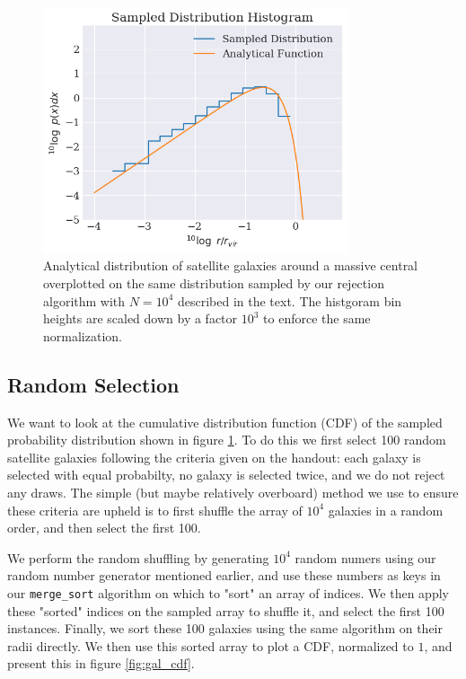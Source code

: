 \begin{figure}
    \centering
    \includegraphics[width=0.8\textwidth]{results/satellite_galaxies_pdf.png}
    \caption{Analytical distribution of satellite galaxies around a massive central overplotted on the same distribution sampled by our rejection algorithm with $N=10^4$ described in the text. The histgoram bin heights are scaled down by a factor $10^3$ to enforce the same normalization.}
    \label{fig:gal_pdf}
\end{figure}


\subsection{Random Selection}

We want to look at the cumulative distribution function (CDF) of the sampled probability distribution shown in figure \ref{fig:gal_pdf}. To do this we first select 100 random satellite galaxies following the criteria given on the handout: each galaxy is selected with equal probabilty, no galaxy is selected twice, and we do not reject any draws. The simple (but maybe relatively overboard) method we use to ensure these criteria are upheld is to first shuffle the array of $10^4$ galaxies in a random order, and then select the first 100. 

We perform the random shuffling by generating $10^4$ random numers using our random number generator mentioned earlier, and use these numbers as keys in our \texttt{merge\_sort} algorithm on which to "sort" an array of indices. We then apply these "sorted" indices on the sampled array to shuffle it, and select the first 100 instances. Finally, we sort these 100 galaxies using the same algorithm on their radii directly. We then use this sorted array to plot a CDF, normalized to $1$, and present this in figure \ref{fig:gal_cdf}.

